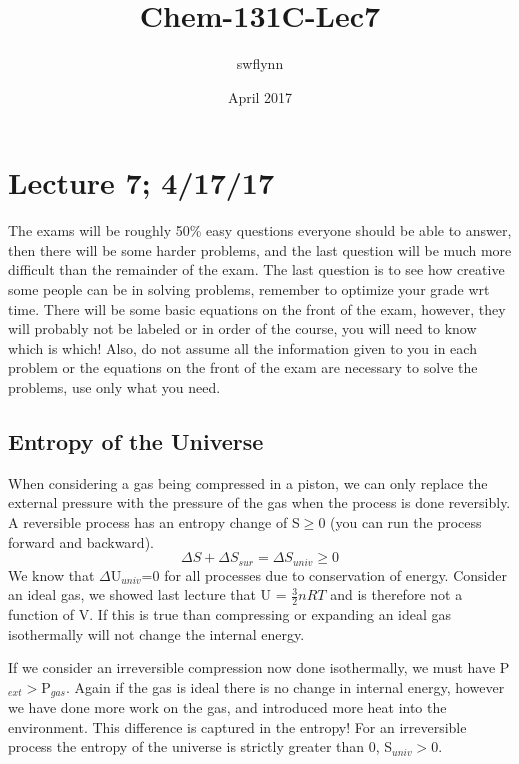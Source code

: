\documentclass{article}
\title{Chem-131C-Lec7}
\author{swflynn }
\date{April 2017}
\begin{document}
\maketitle

\section*{Lecture 7; 4/17/17}
The exams will be roughly 50\% easy questions everyone should be able to answer, then there will be some harder problems, and the last question will be much more difficult than the remainder of the exam. 
The last question is to see how creative some people can be in solving problems, remember to optimize your grade wrt time.
There will be some basic equations on the front of the exam, however, they will probably not be labeled or in order of the course, you will need to know which is which!
Also, do not assume all the information given to you in each problem or the equations on the front of the exam are necessary to solve the problems, use only what you need.

\subsection*{Entropy of the Universe}
When considering a gas being compressed in a piston, we can only replace the external pressure with the pressure of the gas when the process is done reversibly. 
A reversible process has an entropy change of S$\geq$0 (you can run the process forward and backward).
\begin{equation}
    \Delta S + \Delta S_{sur} = \Delta S_{univ} \geq 0
\end{equation}
We know that $\Delta$U$_{univ}$=0 for all processes due to conservation of energy.
Consider an ideal gas, we showed last lecture that U = $\frac{3}{2}nRT$ and is therefore not a function of V. 
If this is true than compressing or expanding an ideal gas isothermally will not change the internal energy. 

If we consider an irreversible compression now done isothermally, we must have P$_{ext} >$P$_{gas}$. 
Again if the gas is ideal there is no change in internal energy, however we have done more work on the gas, and introduced more heat into the environment. 
This difference is captured in the entropy!
For an irreversible process the entropy of the universe is strictly greater than 0, S$_{univ}>$0. 
\end{document}

